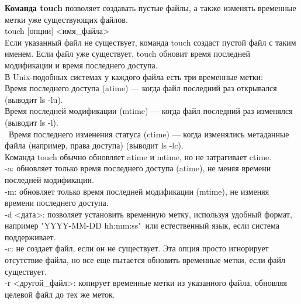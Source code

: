\noindent \textbf{Команда touch} позволяет создавать пустые файлы, а также изменять временные метки уже существующих файлов. \\
touch [опции] <имя\_файла> \\
Если указанный файл не существует, команда touch создаст пустой файл с таким именем. Если файл уже существует, touch обновит время последней модификации и время последнего доступа. \\
В Unix-подобных системах у каждого файла есть три временные метки: \\
Время последнего доступа (atime) — когда файл последний раз открывался (выводит ls -lu). \\
Время последней модификации (mtime) — когда файл последний раз изменялся (выводит ls -l). \\\
Время последнего изменения статуса (ctime) — когда изменялись метаданные файла (например, права доступа) (выводит ls -lc). \\
Команда touch обычно обновляет atime и mtime, но не затрагивает ctime. \\
-a: обновляет только время последнего доступа (atime), не меняя времени последней модификации. \\
-m: обновляет только время последней модификации (mtime), не изменяя времени последнего доступа. \\
-d <дата>: позволяет установить временную метку, используя удобный формат, например "YYYY-MM-DD hh:mm:ss"\, или естественный язык, если система поддерживает. \\
-c: не создает файл, если он не существует. Эта опция просто игнорирует отсутствие файла, но все еще пытается обновить временные метки, если файл существует. \\
-r <другой\_файл>: копирует временные метки из указанного файла, обновляя целевой файл до тех же меток. \\

